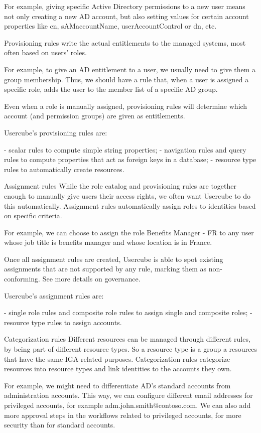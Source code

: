 For example, giving specific Active Directory permissions to a new user means not only creating a new AD account, but also setting values for certain account properties like cn, sAMaccountName, userAccountControl or dn, etc.

Provisioning rules write the actual entitlements to the managed systems, most often based on users' roles.

For example, to give an AD entitlement to a user, we usually need to give them a group membership. Thus, we should have a rule that, when a user is assigned a specific role, adds the user to the member list of a specific AD group.

Even when a role is manually assigned, provisioning rules will determine which account (and permission groups) are given as entitlements.

Usercube's provisioning rules are:

- scalar rules to compute simple string properties;
- navigation rules and query rules to compute properties that act as foreign keys in a database;
- resource type rules to automatically create resources.

Assignment rules
While the role catalog and provisioning rules are together enough to manually give users their access rights, we often want Usercube to do this automatically. Assignment rules automatically assign roles to identities based on specific criteria.

For example, we can choose to assign the role Benefits Manager - FR to any user whose job title is benefits manager and whose location is in France.

Once all assignment rules are created, Usercube is able to spot existing assignments that are not supported by any rule, marking them as non-conforming. See more details on governance.

Usercube's assignment rules are:

- single role rules and composite role rules to assign single and composite roles;
- resource type rules to assign accounts.

Categorization rules
Different resources can be managed through different rules, by being part of different resource types. So a resource type is a group a resources that have the same IGA-related purposes. Categorization rules categorize resources into resource types and link identities to the accounts they own.

For example, we might need to differentiate AD's standard accounts from administration accounts. This way, we can configure different email addresses for privileged accounts, for example adm.john.smith@contoso.com. We can also add more approval steps in the workflows related to privileged accounts, for more security than for standard accounts.

